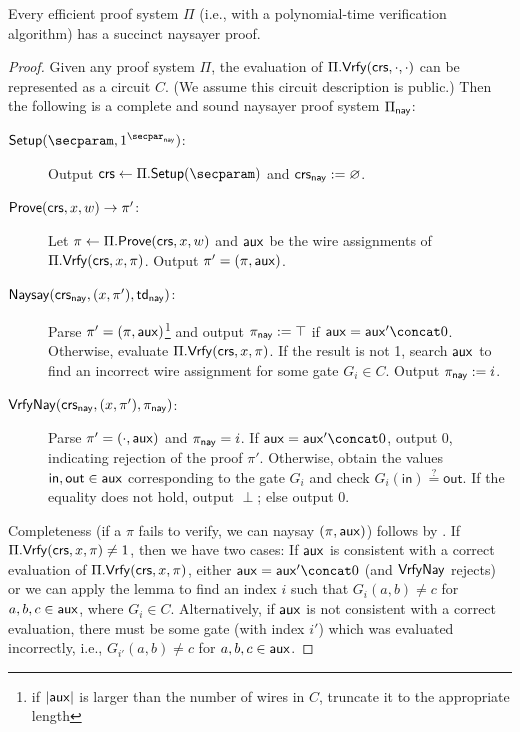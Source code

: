 \begin{theorem}\label{thm:naysayer}
    Every efficient proof system $\Pi$ (i.e., with a polynomial-time verification algorithm) has a succinct naysayer proof.
\end{theorem}
\begin{proof}
Given any proof system $\Pi$, the evaluation of $\Pi.\mathsf{Vrfy}(\mathsf{crs},\cdot,\cdot)$ can be represented as a circuit $C$. (We assume this circuit description is public.) 
Then the following is a complete and sound naysayer proof system $\Pi_{\mathsf{nay}}$:

\begin{description}
    \item[$\setup(\secparam, \naysecparam)$:] Output $\crs \gets \Pi.\setup(\secparam)$ and $\mathsf{crs}_{\mathsf{nay}} := \varnothing$.
    \item[$\mathsf{Prove}(\mathsf{crs}, x, w) \to \pi'$:] Let $\pi \gets \Pi.\mathsf{Prove}(\mathsf{crs}, x, w)$ and $\mathsf{aux}$ be the wire assignments of $\Pi.\mathsf{Vrfy}(\mathsf{crs}, x, \pi)$. Output $\pi' = (\pi, \mathsf{aux})$.
    \item[$\mathsf{Naysay}(\mathsf{crs}_{\mathsf{nay}}, (x, \pi'), \mathsf{td}_{\mathsf{nay}})$:] Parse $\pi' = (\pi, \mathsf{aux})$\footnote{if $\lvert \mathsf{aux} \rvert$ is larger than the number of wires in $C$, truncate it to the appropriate length} and output $\pi_{\mathsf{nay}} := \top$ if $\aux = \aux' \concat 0$. Otherwise, evaluate $\Pi.\mathsf{Vrfy}(\mathsf{crs}, x, \pi)$. If the result is not 1, search $\mathsf{aux}$ to find an incorrect wire assignment for some gate $G_i \in C$. %
    Output $\pi_{\mathsf{nay}} := i$. 
    \item[${\mathsf{Vrfy}}\mathsf{Nay}(\mathsf{crs}_{\mathsf{nay}}, (x, \pi'), \pi_{\mathsf{nay}})$:] Parse $\pi' = (\cdot, \mathsf{aux})$ and $\pi_{\mathsf{nay}} = i$. If $\aux = \aux' \concat 0$, output 0, indicating rejection of the proof $\pi'$. Otherwise, obtain the values $\mathsf{in},\mathsf{out} \in \mathsf{aux}$ corresponding to the gate $G_i$ %
    and check $G_i(\mathsf{in}) \stackrel{?}{=} \mathsf{out}$. If the equality does not hold, output $\perp$; else output 0.
\end{description}

Completeness (if a $\pi$ fails to verify, we can naysay $(\pi, \mathsf{aux})$) follows by . If $\Pi.\mathsf{Vrfy}(\mathsf{crs},x,\pi) \neq 1$, then we have two cases: If $\mathsf{aux}$ is consistent with a correct evaluation of $\Pi.\mathsf{Vrfy}(\mathsf{crs}, x, \pi)$, either $\aux = \aux' \concat 0$ (and ${\mathsf{Vrfy}}\mathsf{Nay}$ rejects) or we can apply the lemma to find an index $i$ such that $G_i(a,b) \neq c$ for $a,b,c \in \mathsf{aux}$, where $G_i \in C$. Alternatively, if $\mathsf{aux}$ is not consistent with a correct evaluation, there must be some gate (with index $i'$) which was evaluated incorrectly, i.e., $G_{i'}(a,b) \neq c$ for $a,b,c \in \mathsf{aux}$.


\end{proof}
